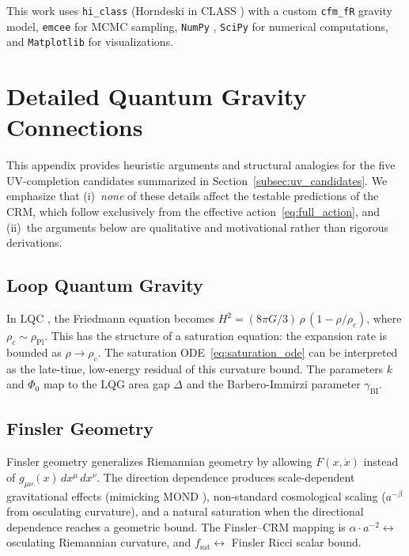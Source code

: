 \documentclass[aps,prd,twocolumn,superscriptaddress,nofootinbib]{revtex4-2}
\begin{document}
This work uses \texttt{hi\_class} \cite{Zumalacarregui2017} (Horndeski in CLASS \cite{Blas2011}) with a custom \texttt{cfm\_fR} gravity model, \texttt{emcee} \cite{ForemanMackey2013} for MCMC sampling, \texttt{NumPy} \cite{Harris2020}, \texttt{SciPy} \cite{Virtanen2020} for numerical computations, and \texttt{Matplotlib} \cite{Hunter2007} for visualizations.

\appendix
\section{Detailed Quantum Gravity Connections}
\label{app:qg_details}

This appendix provides heuristic arguments and structural analogies for the five UV-completion candidates summarized in Section~\ref{subsec:uv_candidates}. We emphasize that (i)~\textit{none} of these details affect the testable predictions of the CRM, which follow exclusively from the effective action~\eqref{eq:full_action}, and (ii)~the arguments below are qualitative and motivational rather than rigorous derivations.

\subsection{Loop Quantum Gravity}
In LQC \cite{Ashtekar2011}, the Friedmann equation becomes $H^2 = (8\pi G/3)\,\rho\,(1 - \rho/\rho_c)$, where $\rho_c \sim \rho_{\mathrm{Pl}}$. This has the structure of a saturation equation: the expansion rate is bounded as $\rho \to \rho_c$. The saturation ODE~\eqref{eq:saturation_ode} can be interpreted as the late-time, low-energy residual of this curvature bound. The parameters $k$ and $\Phi_0$ map to the LQG area gap $\Delta$ and the Barbero-Immirzi parameter $\gamma_{\mathrm{BI}}$.

\subsection{Finsler Geometry}
Finsler geometry \cite{Bao2000} generalizes Riemannian geometry by allowing $F(x, \dot{x})$ instead of $g_{\mu\nu}(x)\,dx^\mu\,dx^\nu$. The direction dependence produces scale-dependent gravitational effects (mimicking MOND \cite{Chang2009}), non-standard cosmological scaling ($a^{-\beta}$ from osculating curvature), and a natural saturation when the directional dependence reaches a geometric bound. The Finsler--CRM mapping is $\alpha \cdot a^{-2} \leftrightarrow$ osculating Riemannian curvature, and $f_{\mathrm{sat}} \leftrightarrow$ Finsler Ricci scalar bound.
\end{document}
